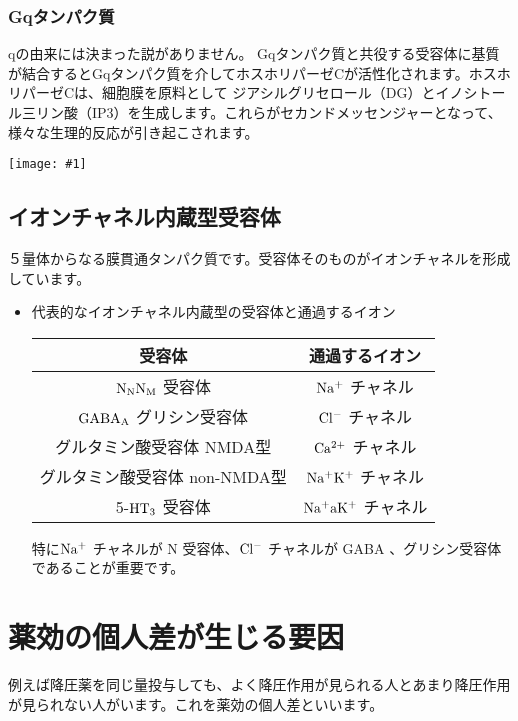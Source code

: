 \documentclass[a4paper,papersize,dvipdfmx]{jsarticle}
\newcommand{\pict}[2]{\begin{center} \texttt{[image: \#1]} \end{center}}   %
\begin{document}
\subsubsection{Gqタンパク質}
qの由来には決まった説がありません。
Gqタンパク質と共役する受容体に基質が結合するとGqタンパク質を介してホスホリパーゼCが活性化されます。ホスホリパーゼCは、細胞膜を原料として
ジアシルグリセロール（DG）とイノシトール三リン酸（IP3）を生成します。これらがセカンドメッセンジャーとなって、様々な生理的反応が引き起こされます。


\begin{tcolorbox}[colback=white,colbacktitle=black,coltitle=white,title={まとめ}]
\pict{imgs/c3-3.png}{10}
\end{tcolorbox}


\subsection{イオンチャネル内蔵型受容体}

５量体からなる膜貫通タンパク質です。受容体そのものがイオンチャネルを形成しています。


\begin{itemize}
\item 代表的なイオンチャネル内蔵型の受容体と通過するイオン

\begin{table}[H]
\begin{center}
\begin{tabular}{|c|c|}
\hline
受容体                  & 通過するイオン              \\ \hline
$\rm N_N N_M$ 受容体    & $\rm Na^+$ チャネル      \\ \hline
$\rm GABA_A$ グリシン受容体 & $\rm Cl^-$ チャネル      \\ \hline
グルタミン酸受容体 NMDA型      & $\rm Ca^{2+}$ チャネル   \\ \hline
グルタミン酸受容体 non-NMDA型  & $\rm Na^+ K^+$ チャネル  \\ \hline
5-$\rm HT_3$ 受容体     & $\rm Na^+ aK^+$ チャネル \\ \hline
\end{tabular}
\end{center}
\end{table}

特に$\rm Na^+$ チャネルが N 受容体、$\rm Cl^-$ チャネルが GABA 、グリシン受容体であることが重要です。

\end{itemize}
\section{薬効の個人差が生じる要因}
例えば降圧薬を同じ量投与しても、よく降圧作用が見られる人とあまり降圧作用が見られない人がいます。これを薬効の個人差といいます。
\end{document}
